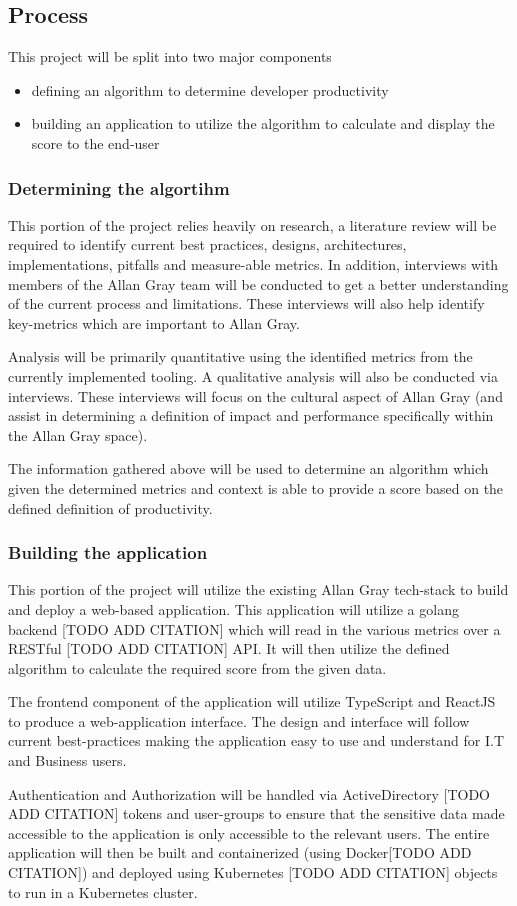 \subsection{Process}
This project will be split into two major components
\begin{itemize}
  \item defining an algorithm to determine developer productivity
  \item building an application to utilize the algorithm to calculate and display the score to the end-user
\end{itemize}

\subsubsection{Determining the algortihm}
This portion of the project relies heavily on research, a literature review will be required to identify current best practices, designs, architectures, implementations, pitfalls and measure-able metrics.
In addition, interviews with members of the Allan Gray team will be conducted to get a better understanding of the current process and limitations. These interviews will also help identify key-metrics which are important to Allan Gray.

Analysis will be primarily quantitative using the identified metrics from the currently implemented tooling. A qualitative analysis will also be conducted via interviews. These interviews will focus on the cultural aspect of
Allan Gray (and assist in determining a definition of impact and performance specifically within the Allan Gray space).

The information gathered above will be used to determine an algorithm which given the determined metrics and context is able to provide a score based on the defined definition of productivity.

\subsubsection{Building the application}
This portion of the project will utilize the existing Allan Gray tech-stack to build and deploy a web-based application.
This application will utilize a golang backend [TODO ADD CITATION] which will read in the various metrics over a RESTful [TODO ADD CITATION] API.
It will then utilize the defined algorithm to calculate the required score from the given data.

The frontend component of the application will utilize TypeScript and ReactJS to produce a web-application interface. The design and interface will follow current best-practices making the application easy to use and understand for I.T and Business users.

Authentication and Authorization will be handled via ActiveDirectory [TODO ADD CITATION] tokens and user-groups to ensure that the sensitive data made accessible to the application is only accessible to the relevant users.
The entire application will then be built and containerized (using Docker[TODO ADD CITATION]) and deployed using Kubernetes [TODO ADD CITATION] objects to run in a Kubernetes cluster.
